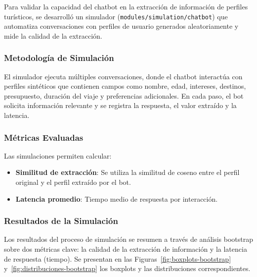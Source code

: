 \documentclass[runningheads]{llncs}
\begin{document}
Para validar la capacidad del chatbot en la extracción de información de perfiles turísticos, se desarrolló un simulador (\texttt{modules/simulation/chatbot}) que automatiza conversaciones con perfiles de usuario generados aleatoriamente y mide la calidad de la extracción.

\subsubsection{Metodología de Simulación}

El simulador ejecuta múltiples conversaciones, donde el chatbot interactúa con perfiles sintéticos que contienen campos como nombre, edad, intereses, destinos, presupuesto, duración del viaje y preferencias adicionales. En cada paso, el bot solicita información relevante y se registra la respuesta, el valor extraído y la latencia.

\subsubsection{Métricas Evaluadas}

Las simulaciones permiten calcular:
\begin{itemize}
    \item \textbf{Similitud de extracción}: Se utiliza la similitud de coseno entre el perfil original y el perfil extraído por el bot.
    \item \textbf{Latencia promedio}: Tiempo medio de respuesta por interacción.
\end{itemize}

\subsubsection{Resultados de la Simulación}

Los resultados del proceso de simulación se resumen a través de análisis bootstrap sobre dos métricas clave: la calidad de la extracción de información y la latencia de respuesta (tiempo). Se presentan en las Figuras~\ref{fig:boxplots-bootstrap} y~\ref{fig:distribuciones-bootstrap} los boxplots y las distribuciones correspondientes.
\end{document}
